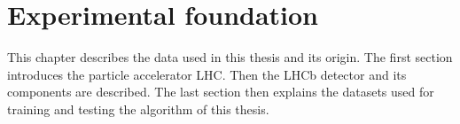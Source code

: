 \chapter{Experimental foundation}

This chapter describes the data used in this thesis and its origin.
The first section introduces the particle accelerator LHC.
Then the LHCb detector and its components are described.
The last section then explains the datasets used for training and testing the algorithm of this thesis.




